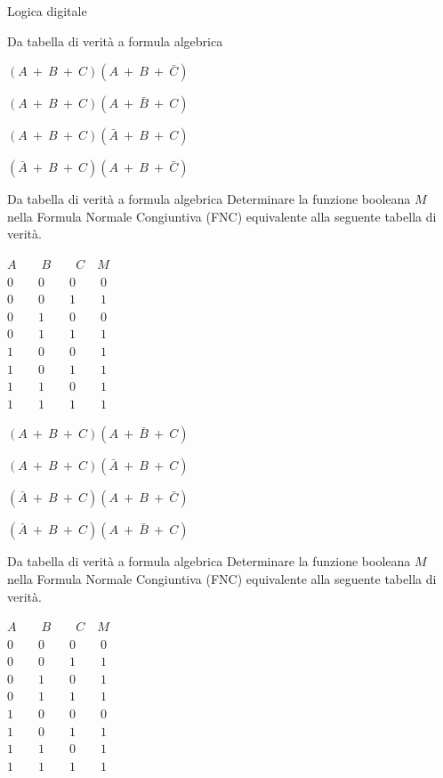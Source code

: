 \documentclass[11pt]{article}
\begin{document}
\begin{quiz}{Logica digitale}
\begin{multi}[points=1,shuffle=true]{Da tabella di verità a formula algebrica}
    \item* $(A\ +\ B\ +\ C)(A\ +\ B\ +\ \bar{C})$
    \item $(A\ +\ B\ +\ C)(A\ +\ \bar{B}\ +\ C)$
    \item $(A\ +\ B\ +\ C)(\bar{A}\ +\ B\ +\ C)$
    \item $(\bar{A}\ +\ B\ +\ C)(A\ +\ B\ +\ \bar{C})$
\end{multi}

\begin{multi}[points=1,shuffle=true]{Da tabella di verità a formula algebrica}
    Determinare la funzione booleana $M$ nella Formula Normale Congiuntiva (FNC) equivalente alla seguente tabella di verit\`{a}.

    $A \qquad  B \qquad  C \quad M$ \\
    $0 \qquad 0 \qquad 0 \qquad 0$ \\
    $0 \qquad 0 \qquad 1 \qquad 1$ \\
    $0 \qquad 1 \qquad 0 \qquad 0$ \\
    $0 \qquad 1 \qquad 1 \qquad 1$ \\
    $1 \qquad 0 \qquad 0 \qquad 1$ \\
    $1 \qquad 0 \qquad 1 \qquad 1$ \\
    $1 \qquad 1 \qquad 0 \qquad 1$ \\
    $1 \qquad 1 \qquad 1 \qquad 1$ \\
    
    \item* $(A\ +\ B\ +\ C)(A\ +\ \bar{B}\ +\ C)$
    \item $(A\ +\ B\ +\ C)(\bar{A}\ +\ B\ +\ C)$
    \item $(\bar{A}\ +\ B\ +\ C)(A\ +\ B\ +\ \bar{C})$
    \item $(\bar{A}\ +\ B\ +\ C)(A\ +\ \bar{B}\ +\ C)$
\end{multi}

\begin{multi}[points=1,shuffle=true]{Da tabella di verità a formula algebrica}
    Determinare la funzione booleana $M$ nella Formula Normale Congiuntiva (FNC) equivalente alla seguente tabella di verit\`{a}.

    $A \qquad  B \qquad  C \quad M$ \\
    $0 \qquad 0 \qquad 0 \qquad 0$ \\
    $0 \qquad 0 \qquad 1 \qquad 1$ \\
    $0 \qquad 1 \qquad 0 \qquad 1$ \\
    $0 \qquad 1 \qquad 1 \qquad 1$ \\
    $1 \qquad 0 \qquad 0 \qquad 0$ \\
    $1 \qquad 0 \qquad 1 \qquad 1$ \\
    $1 \qquad 1 \qquad 0 \qquad 1$ \\
    $1 \qquad 1 \qquad 1 \qquad 1$ \\
    

\end{multi}
\end{quiz}
\end{document}
